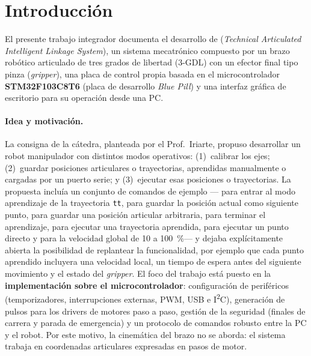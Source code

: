 \section{Introducción}\label{sec:intro}

El presente trabajo integrador documenta el desarrollo de \tails{} (\emph{Technical
Articulated Intelligent Linkage System}), un sistema mecatrónico compuesto por un brazo
robótico articulado de tres grados de libertad (3-GDL) con un efector final tipo pinza
(\emph{gripper}), una placa de control propia basada en el microcontrolador
\textbf{STM32F103C8T6} (placa de desarrollo \emph{Blue Pill}) y una interfaz gráfica de
escritorio para su operación desde una PC.

\paragraph{Idea y motivación.}
La consigna de la cátedra, planteada por el Prof.\ Iriarte, propuso desarrollar un robot
manipulador con distintos modos operativos: (1)~calibrar los ejes; (2)~guardar posiciones
articulares o trayectorias, aprendidas manualmente o cargadas por un puerto serie; y
(3)~ejecutar esas posiciones o trayectorias. La propuesta incluía un conjunto de comandos de
ejemplo — para entrar al modo aprendizaje de la trayectoria \texttt{tt}, 
para guardar la posición actual como siguiente punto,  para guardar una
posición articular arbitraria,  para terminar el aprendizaje,  para ejecutar
una trayectoria aprendida,  para ejecutar un punto directo y  para
la velocidad global de 10 a 100~\%— y dejaba explícitamente abierta la posibilidad de replantear
la funcionalidad, por ejemplo que cada punto aprendido incluyera una velocidad local, un tiempo
de espera antes del siguiente movimiento y el estado del \emph{gripper}. El foco del trabajo
está puesto en la \textbf{implementación sobre el
microcontrolador}: configuración de periféricos (temporizadores, interrupciones externas,
PWM, USB e I\textsuperscript{2}C), generación de pulsos para los drivers de motores paso a
paso, gestión de la seguridad (finales de carrera y parada de emergencia) y un protocolo de
comandos robusto entre la PC y el robot. Por este motivo, la cinemática del brazo no se
aborda: el sistema trabaja en coordenadas articulares expresadas en pasos de motor.

